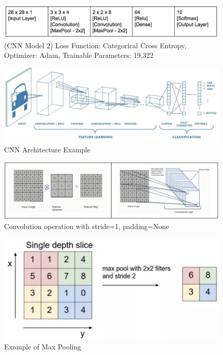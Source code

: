 \documentclass[12pt]{article}
\begin{document}
\begin{figure}[h!]
  \begin{center}
    \includegraphics[scale=0.5]{fig4}
  \end{center}
  \caption{(CNN Model 2) Loss Function: Categorical Cross Entropy, Optimizer:
    Adam, Trainable Parameters: 19,322}
  \label{fig:cnnArchPool}
\end{figure}

\begin{figure}[h!]
  \begin{center}
    \includegraphics[scale=0.5]{fig5}
    \end{center}
  \caption{CNN Architecture Example}
  \label{fig:CNN}
\end{figure}

\begin{figure}[h!]
  \begin{center}
    \includegraphics[scale=0.5]{fig6}
    \end{center}
  \caption{Convolution operation with stride=1, padding=None}
  \label{fig:CNNStridePad}
\end{figure}

\begin{figure}[h!]
  \begin{center}
    \includegraphics[scale=0.5]{fig7}
  \end{center}
  \caption{Example of Max Pooling}
  \label{fig:CNNPooling}
  \end{figure}
\end{document}
